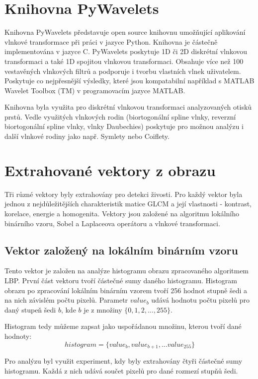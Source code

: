 \section{Knihovna PyWavelets}
Knihovna PyWavelets představuje open source knihovnu umožňující aplikování vlnkové transformace při práci v jazyce Python. Knihovna je částečně implementována v jazyce C. PyWavelets poskytuje 1D či 2D diskrétní vlnkovou transformaci a také 1D spojitou vlnkovou transformaci. Obsahuje více než 100 vestavěných vlnkových filtrů a podporuje i tvorbu vlastních vlnek uživatelem. Poskytuje co nejpřesnější výsledky, které jsou kompatabilní například s MATLAB Wavelet Toolbox (TM) v programovacím jazyce MATLAB.

Knihovna byla využita pro diskrétní vlnkovou transformaci analyzovaných otisků prstů. Vedle využitých vlnkových rodin (biortogonální spline vlnky, reverzní biortogonální spline vlnky, vlnky Daubechies) poskytuje pro možnou analýzu i další vlnkové rodiny jako např. Symlety nebo Coiflety. \cite{PywtAbout}

\section{Extrahované vektory z obrazu}
Tři různé vektory byly extrahovány pro detekci živosti. Pro každý vektor byla jednou z nejdůležitějších charakteristik matice GLCM a její vlastnosti - kontrast, korelace, energie a homogenita. Vektory jsou založené na algoritmu lokálního binárního vzoru, Sobel a Laplaceova operátoru a vlnkové transformaci.

\subsection{Vektor založený na lokálním binárním vzoru}
Tento vektor je založen na analýze histogramu obrazu zpracovaného algoritmem LBP. První část vektoru tvoří částečné sumy daného histogramu. Histogram obrazu po zpracování lokálním binárním vzorem tvoří 256 hodnot stupně šedi a na nich závislém počtu pixelů. Parametr $value_b$ udává hodnotu počtu pixelů pro daný stupeň šedi $b$, kde $b$ je z množiny $\{0,1,2,...,255\}$.

Histogram tedy můžeme zapsat jako uspořádanou množinu, kterou tvoří dané hodnoty:
$$histogram = \{value_b, value_{b+1}, ... value_{255}\}$$

Pro analýzu byl využit experiment, kdy byly extrahovány čtyři částečné sumy histogramu. Každá z nich udává součet pixelů pro dané rozmezí stupňů šedi.


